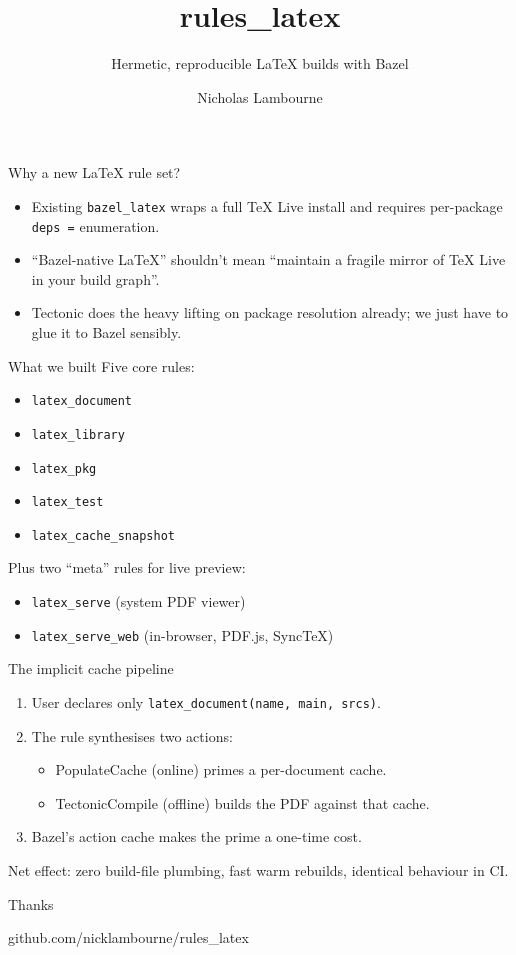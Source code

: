 \documentclass{beamer}
\title{rules\_latex}
\subtitle{Hermetic, reproducible LaTeX builds with Bazel}
\author{Nicholas Lambourne}
\date{}
\institute{Example Conference 2026}
\begin{document}
\maketitle

\begin{frame}{Why a new LaTeX rule set?}
  \begin{itemize}
    \item Existing \texttt{bazel\_latex} wraps a full TeX Live install
      and requires per-package \texttt{deps =} enumeration.
    \item ``Bazel-native LaTeX'' shouldn't mean ``maintain a fragile
      mirror of TeX Live in your build graph''.
    \item Tectonic does the heavy lifting on package resolution
      already; we just have to glue it to Bazel sensibly.
  \end{itemize}
\end{frame}

\begin{frame}{What we built}
  Five core rules:
  \begin{itemize}
    \item \texttt{latex\_document}
    \item \texttt{latex\_library}
    \item \texttt{latex\_pkg}
    \item \texttt{latex\_test}
    \item \texttt{latex\_cache\_snapshot}
  \end{itemize}
  Plus two ``meta'' rules for live preview:
  \begin{itemize}
    \item \texttt{latex\_serve} (system PDF viewer)
    \item \texttt{latex\_serve\_web} (in-browser, PDF.js, SyncTeX)
  \end{itemize}
\end{frame}

\begin{frame}{The implicit cache pipeline}
  \begin{enumerate}
    \item User declares only \texttt{latex\_document(name, main, srcs)}.
    \item The rule synthesises two actions:
      \begin{itemize}
        \item \alert{PopulateCache} (online) primes a per-document cache.
        \item \alert{TectonicCompile} (offline) builds the PDF
          against that cache.
      \end{itemize}
    \item Bazel's action cache makes the prime a one-time cost.
  \end{enumerate}
  Net effect: zero build-file plumbing, fast warm rebuilds, identical
  behaviour in CI.
\end{frame}

\begin{frame}{Thanks}
  \begin{center}
    \Large github.com/nicklambourne/rules\_latex
  \end{center}
\end{frame}
\end{document}
